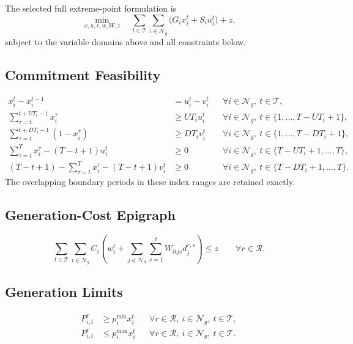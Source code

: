 \documentclass[11pt]{article}
\begin{document}
The selected full extreme-point formulation is
\begin{equation}
 \min_{x,u,v,w,W,z}\quad
 \sum_{t\in\mathcal T}\sum_{i\in\mathcal N_g}
 \bigl(G_ix_i^t+S_iu_i^t\bigr)+z,
 \label{eq:objective}
\end{equation}
subject to the variable domains above and all constraints below.

\subsection{Commitment Feasibility}

\begin{align}
 x_i^t-x_i^{t-1}&=u_i^t-v_i^t
 &&\forall i\in\mathcal N_g,\ t\in\mathcal T,\label{eq:transition}\\
 \sum_{\tau=t}^{t+UT_i-1}x_i^\tau&\ge UT_i u_i^t
 &&\forall i\in\mathcal N_g,\ t\in\{1,\ldots,T-UT_i+1\},\label{eq:up}\\
 \sum_{\tau=t}^{t+DT_i-1}(1-x_i^\tau)&\ge DT_i v_i^t
 &&\forall i\in\mathcal N_g,\ t\in\{1,\ldots,T-DT_i+1\},\label{eq:down}\\
 \sum_{\tau=t}^{T}x_i^\tau-(T-t+1)u_i^t&\ge0
 &&\forall i\in\mathcal N_g,\ t\in\{T-UT_i+1,\ldots,T\},\label{eq:terminal-up}\\
 (T-t+1)-\sum_{\tau=t}^{T}x_i^\tau-(T-t+1)v_i^t&\ge0
 &&\forall i\in\mathcal N_g,\ t\in\{T-DT_i+1,\ldots,T\}.\label{eq:terminal-down}
\end{align}
The overlapping boundary periods in these index ranges are retained exactly.

\subsection{Generation-Cost Epigraph}

\begin{equation}
 \sum_{t\in\mathcal T}\sum_{i\in\mathcal N_g}
 C_i\left(w_i^t+\sum_{j\in\mathcal N_d}\sum_{s=1}^{t}
 W_{itjs}d_j^{r,s}\right)\le z
 \qquad\forall r\in\mathcal R.
 \label{eq:cost}
\end{equation}

\subsection{Generation Limits}

\begin{align}
 P_{i,t}^r&\ge p_i^{\min}x_i^t
 &&\forall r\in\mathcal R,\ i\in\mathcal N_g,\ t\in\mathcal T,\label{eq:gen-lower}\\
 P_{i,t}^r&\le p_i^{\max}x_i^t
 &&\forall r\in\mathcal R,\ i\in\mathcal N_g,\ t\in\mathcal T.\label{eq:gen-upper}
\end{align}
\end{document}
